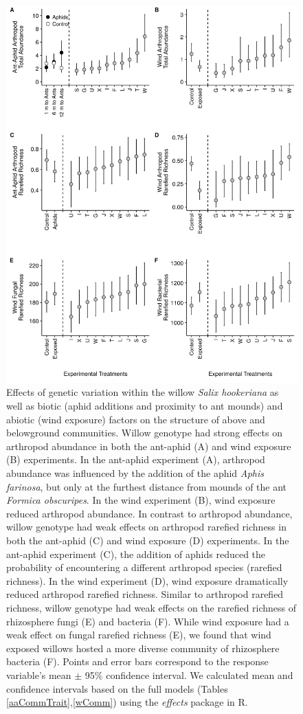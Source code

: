 \documentclass[11pt]{article}
\begin{document}
\begin{figure}[h!]
\centering
\includegraphics[scale = 0.16]{image03.png}
\caption{Effects of genetic variation within the willow
\textit{Salix hookeriana} as well as biotic (aphid additions and proximity
to ant mounds) and abiotic (wind exposure) factors on the structure of
above and belowground communities. Willow genotype had strong effects on
arthropod abundance in both the ant-aphid (A) and wind exposure (B)
experiments. In the ant-aphid experiment (A), arthropod abundance was
influenced by the addition of the aphid \textit{Aphis farinosa}, but only
at the furthest distance from mounds of the ant \textit{Formica
obscuripes}. In the wind experiment (B), wind exposure reduced arthropod
abundance. In contrast to arthropod abundance, willow genotype had weak
effects on arthropod rarefied richness in both the ant-aphid (C) and
wind exposure (D) experiments. In the ant-aphid experiment (C), the
addition of aphids reduced the probability of encountering a different
arthropod species (rarefied richness). In the wind experiment (D), wind
exposure dramatically reduced arthropod rarefied richness. Similar to
arthropod rarefied richness, willow genotype had weak effects on the
rarefied richness of rhizosphere fungi (E) and bacteria (F). While wind
exposure had a weak effect on fungal rarefied richness (E), we found
that wind exposed willows hosted a more diverse community of rhizosphere
bacteria (F). Points and error bars correspond to the response
variable's mean $\pm$ 95\% confidence interval. We calculated mean and confidence intervals based on the full models (Tables \ref{aaCommTrait},\ref{wComm}) using the \textit{effects} package in R.}
\label{Fig:GxEuni}
\end{figure}
\end{document}
